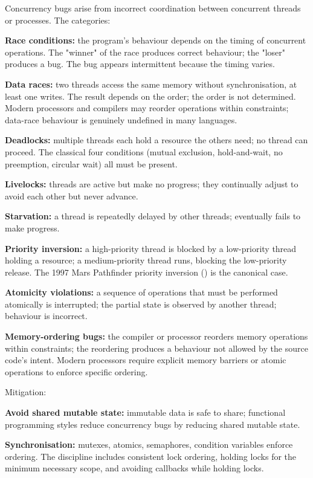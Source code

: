 Concurrency bugs arise from incorrect coordination between concurrent threads or processes. The categories:

\textbf{Race conditions:} the program's behaviour depends on the timing of concurrent operations. The "winner" of the race produces correct behaviour; the "loser" produces a bug. The bug appears intermittent because the timing varies.

\textbf{Data races:} two threads access the same memory without synchronisation, at least one writes. The result depends on the order; the order is not determined. Modern processors and compilers may reorder operations within constraints; data-race behaviour is genuinely undefined in many languages.

\textbf{Deadlocks:} multiple threads each hold a resource the others need; no thread can proceed. The classical four conditions (mutual exclusion, hold-and-wait, no preemption, circular wait) all must be present.

\textbf{Livelocks:} threads are active but make no progress; they continually adjust to avoid each other but never advance.

\textbf{Starvation:} a thread is repeatedly delayed by other threads; eventually fails to make progress.

\textbf{Priority inversion:} a high-priority thread is blocked by a low-priority thread holding a resource; a medium-priority thread runs, blocking the low-priority release. The 1997 Mars Pathfinder priority inversion (\cite{paper:jones-pathfinder-1997}) is the canonical case.

\textbf{Atomicity violations:} a sequence of operations that must be performed atomically is interrupted; the partial state is observed by another thread; behaviour is incorrect.

\textbf{Memory-ordering bugs:} the compiler or processor reorders memory operations within constraints; the reordering produces a behaviour not allowed by the source code's intent. Modern processors require explicit memory barriers or atomic operations to enforce specific ordering.

Mitigation:

\textbf{Avoid shared mutable state:} immutable data is safe to share; functional programming styles reduce concurrency bugs by reducing shared mutable state.

\textbf{Synchronisation:} mutexes, atomics, semaphores, condition variables enforce ordering. The discipline includes consistent lock ordering, holding locks for the minimum necessary scope, and avoiding callbacks while holding locks.

